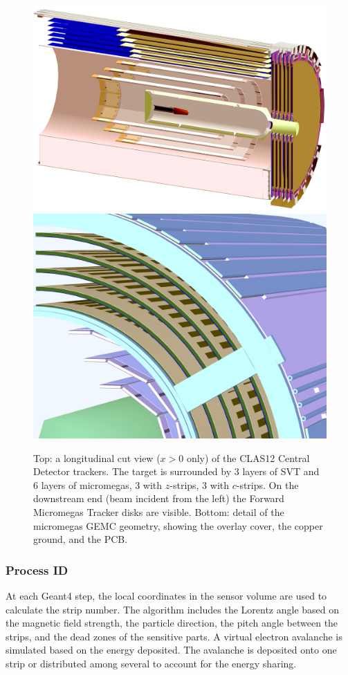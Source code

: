 \begin{figure}
	\centering
	\includegraphics[width=0.99\columnwidth,keepaspectratio]{img/bmtGeometry.png}
	\includegraphics[width=0.99\columnwidth,keepaspectratio]{img/bmtDetail.png}
	\caption{Top: a longitudinal cut view ($x>0$ only) of the CLAS12 Central Detector trackers. The target is surrounded by 3 layers of SVT and
            6 layers of micromegas, 3 with $z$-strips, 3 with $c$-strips. On the downstream end (beam incident from the left)
			the Forward Micromegas Tracker disks are visible.
            Bottom: detail of the micromegas GEMC geometry, showing the overlay cover, the copper ground, and the PCB.}
	\label{fig:bmtGeometry}
\end{figure}


\subsubsection{Process ID}
At each Geant4 step, the local coordinates in the sensor volume are used to calculate the strip number.
The algorithm includes the Lorentz angle based on the magnetic field strength, the particle direction,
the pitch angle between the strips, and the dead zones of the sensitive parts.
A virtual electron avalanche is simulated based on the energy deposited. The avalanche
is deposited onto one strip or distributed among several to account for the energy sharing.



